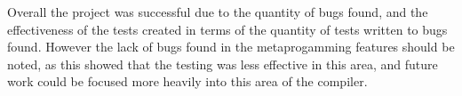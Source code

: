 Overall the project was successful due to the quantity of bugs found, and the effectiveness of the tests created in terms of the quantity of tests written to bugs found. However the lack of bugs found in the metaprogamming features should be noted, as this showed that the testing was less effective in this area, and future work could be focused more heavily into this area of the compiler.
